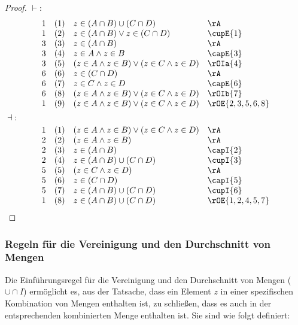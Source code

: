 \documentclass{book}
\theoremstyle{plain}
\theoremstyle{remark}
\theoremstyle{definition}
\begin{document}
\begin{proof}
	\(\vdash:\)
	\[
	\begin{array}{llll}
		1 & (1) & z \in (A\cap B)\cup (C\cap D) & \rA \\
		1 & (2) & z \in (A\cap B)\lor z\in (C\cap D) & \cupE{1} \\
		3 & (3) & z \in (A\cap B) & \rA \\
		3 & (4) & z \in A\land z\in B & \capE{3} \\
		3 & (5) & (z \in A\land z\in B)\lor (z\in C\land z\in D) & \rOIa{4} \\
		6 & (6) &  z \in (C\cap D) & \rA \\
		6 & (7) &  z \in C\land z\in D & \capE{6} \\
		6 & (8) &  (z \in A\land z\in B)\lor (z\in C\land z\in D) & \rOIb{7} \\		
		1 & (9) &  (z \in A\land z\in B)\lor (z\in C\land z\in D) & \rOE{2,3,5,6,8} \\	
	\end{array}
	\]
	\(\dashv:\)
	\[
	\begin{array}{llll}
		1 & (1) & (z \in A\land z\in B)\lor (z\in C\land z\in D) & \rA \\	
		2 & (2) & (z \in A\land z\in B) & \rA \\	
		2 & (3) & z\in (A\cap B) & \capI{2} \\
		2 & (4) & z\in (A\cap B)\cup(C\cap D) & \cupI{3} \\
		5 & (5) & (z\in C\land z\in D) & \rA \\		
		5 & (6) & z\in (C\cap D) & \capI{5} \\
		5 & (7) & z\in (A\cap B)\cup(C\cap D) & \cupI{6} \\
		1 & (8) & z\in (A\cap B)\cup(C\cap D) & \rOE{1,2,4,5,7} \\
	\end{array}
	\]
\end{proof}

\subsubsection{Regeln für die Vereinigung und den Durchschnitt von Mengen}
\label{rule:capcupI} \label{rule:capcupE}

Die Einführungsregel für die Vereinigung und den Durchschnitt von Mengen (\(\cup\cap I\)) ermöglicht es, aus der Tatsache, dass ein Element \( z \) in einer spezifischen Kombination von Mengen enthalten ist, zu schließen, dass es auch in der entsprechenden kombinierten Menge enthalten ist. Sie sind wie folgt definiert:
\end{document}
